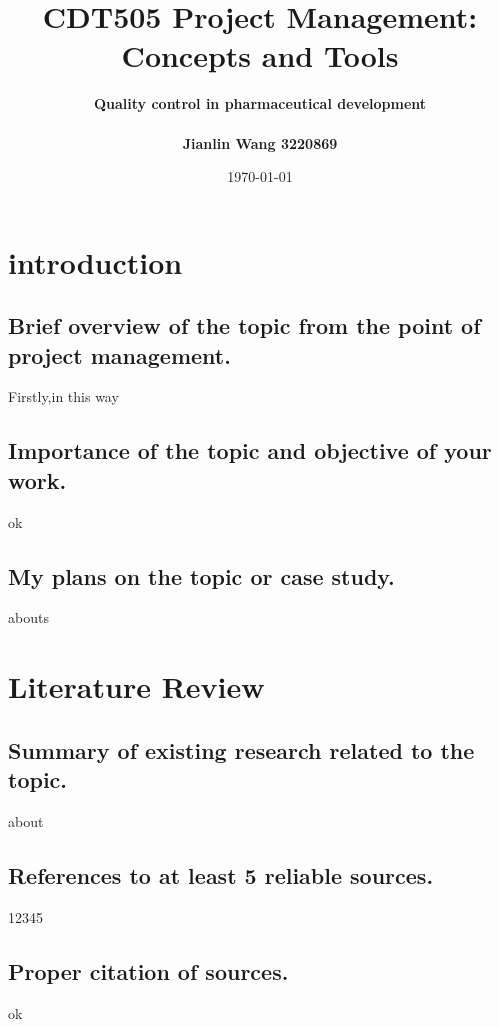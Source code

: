 \documentclass[12pt]{article}
\begin{document}
 
 
\title{\textbf{CDT505 Project Management: Concepts and Tools}}%
\author{
\textbf{Quality control in pharmaceutical development}\\ \\\textbf{Jianlin Wang 3220869}\\
}%
\date{\today}%

\maketitle%

\newpage%

\section{introduction}%
\subsection{Brief overview of the topic from the point of project management.}%
Firstly,in this way%

\subsection{Importance of the topic and objective of your work.}
\indent ok %

\subsection{My plans on the topic or case study.}
abouts

\section{Literature Review}
\subsection{Summary of existing research related to the topic.}
about
\subsection{References to at least 5 reliable sources.}
12345
\subsection{Proper citation of sources.}
ok 
\end{document}
